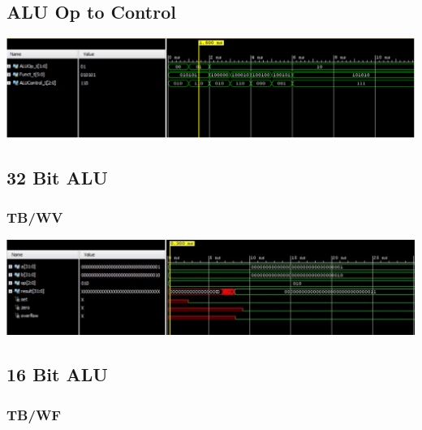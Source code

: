 \documentclass{llncs}
\begin{document}
\subsection{ALU Op to Control}

\includegraphics[scale=.2]{images/aluoptoc.png}
\subsection{32 Bit ALU}
\label{alu:1}
\begin{addmargin}[-5em]{-6em}

\end{addmargin}
\subsubsection{ TB/WV}
\begin{addmargin}[-5em]{-6em}

\end{addmargin}
\includegraphics[scale=.2]{images/32BitALU_tb.png}





\subsection{16 Bit ALU}
\label{alu:2}
\begin{addmargin}[-5em]{-6em}

\end{addmargin}
\subsubsection{TB/WF}
\begin{addmargin}[-5em]{-6em}

\end{addmargin}
\end{document}
